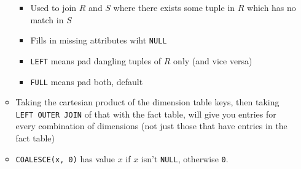 \documentclass[landscape,8pt]{extarticle}
\newcommand{\code}{\lstinline}
\begin{document}
\begin{multicols}{4}
\begin{itemize}
\begin{itemize}
\begin{itemize}
        \item Used to join $R$ and $S$ where there exists some tuple in $R$ which has no match in
        $S$
        \item Fills in missing attributes wiht \code{NULL}
        \item \code{LEFT} means pad dangling tuples of $R$ only (and vice versa)
        \item \code{FULL} means pad both, default
    \end{itemize}
    \item Taking the cartesian product of the dimension table keys, then taking 
    \code{LEFT OUTER JOIN} of that with the fact table, will give you entries for every combination of dimensions
    (not just those that have entries in the fact table)
    \item \code{COALESCE(x, 0)} has value $x$ if $x$ isn't \code{NULL}, otherwise \code{0}.
    \end{itemize}
\end{itemize}
    \end{multicols}
\end{document}
